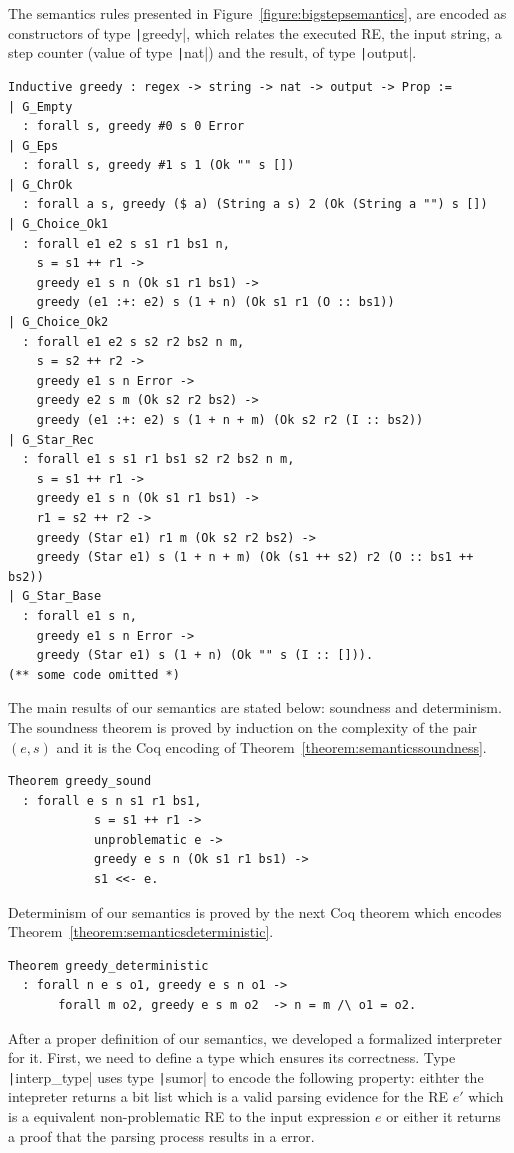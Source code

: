 \documentclass[review]{elsarticle}
\newcommand{\coq}[1]{\texttt|#1|}
\theoremstyle{definition}
\begin{document}
The semantics rules presented in Figure~\ref{figure:bigstepsemantics}, are
encoded as constructors of type \coq{greedy}, which relates the executed RE,
the input string, a step counter (value of type \coq{nat}) and the result,
of type \coq{output}.

\begin{verbatim}
Inductive greedy : regex -> string -> nat -> output -> Prop :=
| G_Empty
  : forall s, greedy #0 s 0 Error
| G_Eps
  : forall s, greedy #1 s 1 (Ok "" s [])
| G_ChrOk 
  : forall a s, greedy ($ a) (String a s) 2 (Ok (String a "") s [])
| G_Choice_Ok1 
  : forall e1 e2 s s1 r1 bs1 n,
    s = s1 ++ r1 ->
    greedy e1 s n (Ok s1 r1 bs1) ->
    greedy (e1 :+: e2) s (1 + n) (Ok s1 r1 (O :: bs1))
| G_Choice_Ok2
  : forall e1 e2 s s2 r2 bs2 n m,
    s = s2 ++ r2 ->
    greedy e1 s n Error ->
    greedy e2 s m (Ok s2 r2 bs2) -> 
    greedy (e1 :+: e2) s (1 + n + m) (Ok s2 r2 (I :: bs2))
| G_Star_Rec
  : forall e1 s s1 r1 bs1 s2 r2 bs2 n m,
    s = s1 ++ r1 ->
    greedy e1 s n (Ok s1 r1 bs1) ->
    r1 = s2 ++ r2 -> 
    greedy (Star e1) r1 m (Ok s2 r2 bs2) ->
    greedy (Star e1) s (1 + n + m) (Ok (s1 ++ s2) r2 (O :: bs1 ++ bs2))
| G_Star_Base
  : forall e1 s n,
    greedy e1 s n Error ->
    greedy (Star e1) s (1 + n) (Ok "" s (I :: [])).
(** some code omitted *)
\end{verbatim}

The main results of our semantics are stated below: soundness and determinism.
The soundness theorem is proved by induction on the complexity of the pair
$(e,s)$ and it is the Coq encoding of Theorem~\ref{theorem:semanticssoundness}.
\begin{verbatim}
Theorem greedy_sound
  : forall e s n s1 r1 bs1,
            s = s1 ++ r1 ->
            unproblematic e -> 
            greedy e s n (Ok s1 r1 bs1) ->
            s1 <<- e.
\end{verbatim}
Determinism of our semantics is proved by the next Coq theorem which encodes 
Theorem~\ref{theorem:semanticsdeterministic}.
\begin{verbatim}
Theorem greedy_deterministic
  : forall n e s o1, greedy e s n o1 ->
       forall m o2, greedy e s m o2  -> n = m /\ o1 = o2.
\end{verbatim}

After a proper definition of our semantics, we developed a formalized
interpreter for it. First, we need to define a type which ensures its
correctness. Type \coq{interp_type} uses type \coq{sumor} to encode the 
following property: eithter the intepreter returns a bit list which 
is a valid parsing evidence for the RE $e'$ which is a equivalent 
non-problematic RE to the input expression $e$ or either it returns a 
proof that the parsing process results in a error. 
\end{document}
